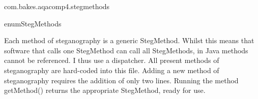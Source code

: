 \begin{texdocpackage}{com.bakes.aqacomp4.stegmethods}
\begin{texdocclass}{enum}{StegMethods}
\begin{texdocclassintro}
 Each method of steganography is a generic StegMethod. Whilst this means that software that calls one StegMethod can call all StegMethods, in Java methods cannot be referenced.
 I thus use a dispatcher. All present methods of steganography are hard-coded into this file. Adding a new method of steganography requires the addition of only two lines.
 Running the method getMethod() returns the appropriate StegMethod, ready for use.\end{texdocclassintro}
\begin{texdocenums}
\end{texdocenums}
\begin{texdocclassmethods}
\end{texdocclassmethods}
\end{texdocclass}


\end{texdocpackage}



